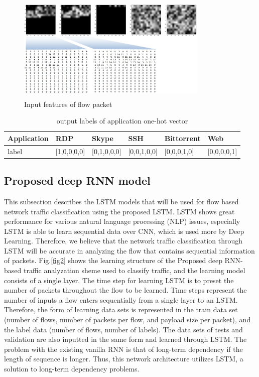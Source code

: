 \documentclass[10pt, twoside, jounal]{IEEEtran}
\begin{document}
\begin{figure}[!t]
\centering
\setlength{\abovecaptionskip}{0pt}
\setlength{\belowcaptionskip}{0pt}
{
\includegraphics[width=3.6in, height=2.0in]{fig1.jpg}
\caption{Input features of flow packet}
\label{fig1}
}
\end{figure}
\begin{table}
\caption{output labels of application one-hot vector}
\setlength{\tabcolsep}{3pt}
\begin{tabular}{|p{55pt}|p{33pt}|p{33pt}|p{33pt}|p{33pt}|p{33pt}|}
\hline
 Application & RDP & Skype & SSH & Bittorrent & Web \\ 
\hline
\hline
label & [1,0,0,0,0] & [0,1,0,0,0] & [0,0,1,0,0] & [0,0,0,1,0] & [0,0,0,0,1] \\ 
\hline
\end{tabular}
\label{tab2}
\end{table}

\subsection{Proposed deep RNN model}
This subsection describes the LSTM models that will be used for flow based network traffic classification using the proposed LSTM. LSTM shows great performance for various natural language processing (NLP) issues, especially LSTM is able to learn sequential data over CNN, which is used more by Deep Learning.
Therefore, we believe that the network traffic classification through LSTM will be accurate in analyzing the flow that contains sequential information of packets.
Fig.\ref{fig2} shows the learning structure of the Proposed deep RNN-based traffic analyzation sheme used to classify traffic, and the learning model consists of a single layer. The time step for learning LSTM is to preset the number of packets throughout the flow to be learned. Time steps represent the number of inputs a flow enters sequentially from a single layer to an LSTM. Therefore, the form of learning data sets is represented in the train data set (number of flows, number of packets per flow, and payload size per packet), and the label data (number of flows, number of labels).
The data sets of tests and validation are also inputted in the same form and learned through LSTM.
The problem with the existing vanilla RNN is that of long-term dependency if the length of sequence is longer. Thus, this network architecture utilizes LSTM, a solution to long-term dependency problems.
\end{document}

